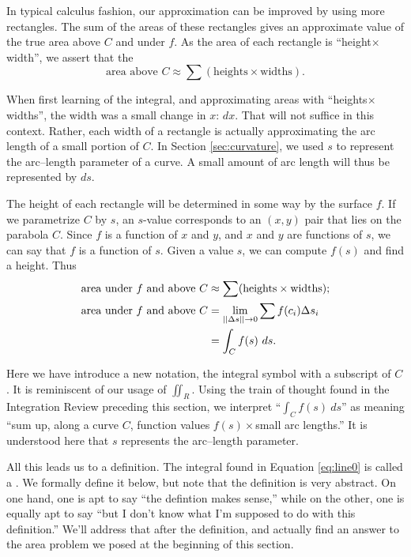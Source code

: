 In typical calculus fashion, our approximation can be improved by using more rectangles. The sum of the areas of these rectangles gives an approximate value of the true area above $C$ and under $f$. As the area of each rectangle is ``height$\times$width'', we assert that the
$$\text{area above $C$}\approx \sum (\text{heights}\times\text{widths}).$$

When first learning of the integral, and approximating areas with ``heights$\times$ widths'', the width was a small change in $x$: $dx$. That will not suffice in this context. Rather, each width of a rectangle is actually approximating the arc length of a small portion of $C$. In Section \ref{sec:curvature}, we used $s$ to represent the arc--length parameter of a curve. A small amount of arc length will thus be represented by $ds$. 

The height of each rectangle will be determined in some way by the surface $f$. If we parametrize $C$ by $s$, an $s$-value corresponds to an $(x,y)$ pair that lies on the parabola $C$. Since $f$ is a function of $x$ and $y$, and $x$ and $y$ are functions of $s$, we can say that $f$ is a function of $s$. Given a value $s$, we can compute $f(s)$ and find a height. Thus
\begin{align}
\text{area under $f$ and above $C$}&\approx \sum (\text{heights}\times\text{widths});\notag\\
		\text{area under $f$ and above $C$}							&=\lim_{||\Delta s||\to0}\sum f(c_i)\Delta s_i\notag\\
									&=\int_Cf(s)\ ds.\label{eq:line0}
\end{align}

Here we have introduce a new notation, the integral symbol with a subscript of $C$. It is reminiscent of our usage of $\iint_R$. Using the train of thought found in the Integration Review preceding this section, we interpret ``$\int_C f(s)\ ds$'' as meaning ``sum up, along a curve $C$, function values $f(s)\times$small arc lengths.'' It is understood here that $s$ represents the arc--length parameter.

All this leads us to a definition. The integral found in Equation \ref{eq:line0} is called a . We formally define it below, but note that the definition is very abstract. On one hand, one is apt to say ``the defintion makes sense,'' while on the other, one is equally apt to say ``but I don't know what I'm supposed to do with this definition.'' We'll address that after the definition, and actually find an answer to the area problem we posed at the beginning of this section.

